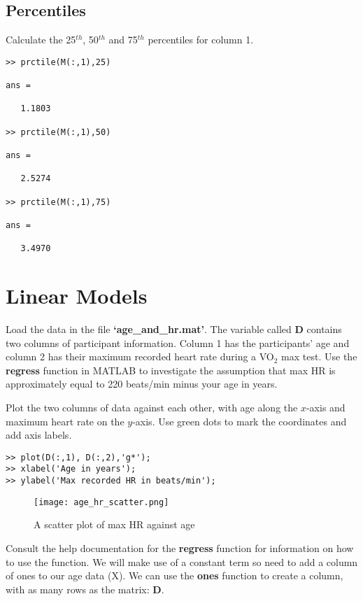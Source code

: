 \documentclass[12pt,a4paper]{article}
\begin{document}
\subsection{Percentiles}
Calculate the 25$^{th}$, 50$^{th}$ and 75$^{th}$ percentiles for column 1.
\begin{lstlisting}[style=Matlab-editor]
>> prctile(M(:,1),25)

ans =

   1.1803

>> prctile(M(:,1),50)

ans =

   2.5274

>> prctile(M(:,1),75)

ans =

   3.4970
\end{lstlisting}

\section{Linear Models}
Load the data in the file \textbf{`age\_and\_hr.mat'}.  
The variable called \textbf{D} contains two columns of participant information.  
Column 1 has the participants' age and column 2 has their maximum recorded heart rate during a VO$_{2}$ max test.  
Use the \textbf{regress} function in MATLAB to investigate the assumption that max HR is approximately equal to 220 beats/min minus your age in years.

Plot the two columns of data against each other, with age along the $x$-axis and maximum heart rate on the $y$-axis.  
Use green dots to mark the coordinates and add axis labels.
\begin{lstlisting}[style=Matlab-editor]
>> plot(D(:,1), D(:,2),'g*');
>> xlabel('Age in years');
>> ylabel('Max recorded HR in beats/min');
\end{lstlisting}
\begin{figure}[H]
	\begin{center}
		\texttt{[image: age\_hr\_scatter.png]}
		\caption{A scatter plot of max HR against age}
		\label{fig:agehr_scatter}
	\end{center}
\end{figure}
Consult the help documentation for the \textbf{regress} function for information on how to use the function.  
We will make use of a constant term so need to add a column of ones to our age data (X).
We can use the \textbf{ones} function to create a column, with as many rows as the matrix: \textbf{D}.
\end{document}
